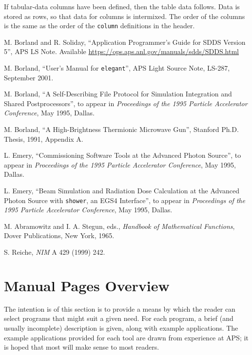 \documentclass[11pt]{article}
\begin{document}
If tabular-data columns have been defined, then the table data follows.
Data is stored as rows, so that data for columns is intermixed.  The
order of the columns is the same as the order of the {\tt column} definitions
in the header.

\begin{thebibliography}{9}

    M. Borland and R. Soliday, ``Application Programmer's Guide for SDDS Version
5'', APS LS Note. Available \href{https://ops.aps.anl.gov/manuals/sdds/SDDS.html}{https://ops.aps.anl.gov/manuals/sdds/SDDS.html}

        M. Borland, ``User's Manual for {\tt elegant}'', 
        APS Light Source Note, LS-287, September 2001.

        M. Borland, ``A Self-Describing File Protocol for Simulation Integration and Shared Postprocessors'',
        to appear in {\em Proceedings of the 1995 Particle Accelerator Conference}, May 1995, Dallas.

        M. Borland, ``A High-Brightness Thermionic Microwave Gun'', Stanford Ph.D. Thesis, 1991, Appendix A.

        L. Emery, ``Commissioning Software Tools at the Advanced Photon Source'', 
        to appear in {\em Proceedings of the 1995 Particle Accelerator Conference}, May 1995, Dallas.

        L. Emery, ``Beam Simulation and Radiation Dose Calculation at the Advanced Photon Source with
        {\tt shower}, an EGS4 Interface'',
         to appear in {\em Proceedings of the 1995 Particle Accelerator Conference}, May 1995, Dallas.

        M. Abramowitz and I. A. Stegun, eds., {\em Handbook of Mathematical Functions}, Dover Publications,
        New York, 1965.

 S. Reiche, {\em NIM} A 429 (1999) 242.

\end{thebibliography}

\newpage
\section{Manual Pages Overview}

\label{ManualPagesOverview}

The intention is of this section is to provide a means by which the
reader can select programs that might suit a given need.  For each
program, a brief (and usually incomplete) description is given, along
with example applications.  The example applications provided for each
tool are drawn from experience at APS; it is hoped that most will make
sense to most readers.
\end{document}
